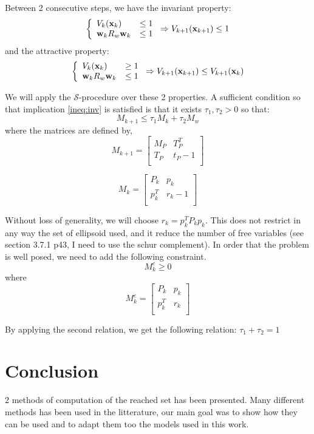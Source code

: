 \documentclass{article}
\theoremstyle{named}
\newcommand{\Sproc}{$\mathcal{S}$-procedure}
\begin{document}
Between 2 consecutive steps, we have the invariant property:
\begin{equation}\label{ineq:inv}
\left\{
\begin{array}{ll}
V_k( \mathbf{x}_k) &\leq 1 \\ 
 \mathbf{w}_k R_w  \mathbf{w}_k &\leq 1
\end{array}
\right.
\Rightarrow
V_{k+1}( \mathbf{x}_{k+1}) \leq 1
\end{equation}
and the attractive property:
\begin{equation}
\left\{
\begin{array}{ll}
V_k( \mathbf{x}_k) &\geq 1 \\ 
 \mathbf{w}_k R_w  \mathbf{w}_k &\leq 1
\end{array}
\right.
\Rightarrow
V_{k+1}( \mathbf{x}_{k+1}) \leq V_{k+1}( \mathbf{x}_k)
\end{equation}

\newcommand{\Mk}{M_k}
\newcommand{\Mkn}{M_{k+1}}
\newcommand{\Mw}{M_w}

\newcommand{\ta}{\tau_1}
\newcommand{\tb}{\tau_2}

We will apply the \Sproc{} over these 2 properties.
A sufficient condition so that implication \ref{ineq:inv} is satisfied is that it exists $\ta,\tb>0$ so that:
$$
\Mkn \leq \ta \Mk + \tb \Mw
$$
where the matrices are defined by,
$$
\Mkn = 
\begin{bmatrix}
M_P & T_P^T\\
T_P & t_P-1\\
\end{bmatrix}
$$

$$
\Mk = 
\begin{bmatrix}
P_k & p_k\\
p_k^T & r_k-1\\
\end{bmatrix}
$$

Without loss of generality, we will choose $r_k = p_k^T P_k p_k$.
This does not restrict in any way the set of ellipsoid used, and it reduce the number of free variables (see section 3.7.1 p43, I need to use the schur complement).
In order that the problem is well posed, we need to add the following constraint.
$$\Mk^c \geq 0$$
where
$$
\Mk^c = 
\begin{bmatrix}
P_k & p_k\\
p_k^T & r_k\\
\end{bmatrix}
$$

By applying the second relation, we get the following relation: $\ta +\tb = 1$

\section{Conclusion}
2 methods of computation of the reached set has been presented.
Many different methods has been used in the litterature, our main goal was to show how they can be used and to adapt them too the models used in this work.
\end{document}
